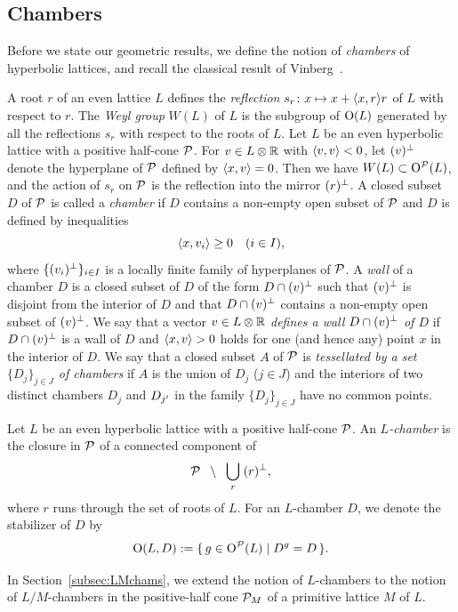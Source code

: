 \documentclass{amsart}
\numberwithin{procedure}{section}
\begin{document}
\subsection{Chambers}\label{subsec:chambers}
%
Before we state our geometric results,
we define the notion of \emph{chambers} of hyperbolic lattices,
and recall the classical result of Vinberg~\cite{Vinberg1973}.
\par
A root $r$ of an even lattice
$L$ defines  the \emph{reflection}  $s_r\colon x\mapsto x+\langle x, r \rangle r$ of $L$
with respect to $r$.
The \emph{Weyl group} $W(L)$ of $L$ is 
the subgroup  of  $\mathord{\mathrm{O}}(L)$
generated by all the reflections $s_r$
with respect to the roots of $L$.
Let $L$ be an even hyperbolic lattice
with a positive half-cone $\mathord{\mathcal P}$.
For $v\in L\otimes\mathord{\mathbb R}$ with $\langle v,v \rangle<0$,
let $(v)\sp{\perp}$ denote the hyperplane of $\mathord{\mathcal P}$ defined by
$\langle x, v \rangle=0$.
Then we have    $W(L)\subset \mathord{\mathrm{O}}^{\mathord{\mathcal P}}(L)$,
and the action of $s_r$ on $\mathord{\mathcal P}$ is the reflection into the mirror $(r)\sp{\perp}$.
A closed subset $D$ of $\mathord{\mathcal P}$ is called a \emph{chamber}
if $D$ contains a non-empty open subset of $\mathord{\mathcal P}$
and $D$ is defined by inequalities
\[
\langle x, v_i \rangle\ge 0\quad(i\in I),
\]
where $\{(v_i)\sp{\perp}\}_{i\in I}$ is a locally finite family of hyperplanes
of $\mathord{\mathcal P}$.
A \emph{wall} of a chamber $D$ is
a closed subset of $D$ of the form $D\cap (v)\sp{\perp}$
such that $(v)\sp{\perp}$ is disjoint from the interior of $D$
and that $D\cap (v)\sp{\perp}$  contains a non-empty open subset of $(v)\sp{\perp}$.
We say that  a vector $v\in L\otimes\mathord{\mathbb R}$ \emph{defines a wall $D\cap (v)\sp{\perp}$ of $D$}
if $D\cap (v)\sp{\perp}$ is a wall of $D$ and $\langle x, v \rangle>0$
holds for one (and hence any) point $x$ in the interior of $D$.
We say that a closed subset $A$ of $\mathord{\mathcal P}$ is
\emph{tessellated by a set $\{D_j\}_{j\in J}$
of chambers} if
$A$ is the union of $D_j$ ($j\in J$)  and
the interiors of two distinct chambers $D_j$ and $D_{j\sp\prime}$ in
the family $\{D_j\}_{j\in J}$ have no common  points.
%
\begin{definition}
Let $L$ be an even hyperbolic lattice
with a positive half-cone $\mathord{\mathcal P}$.
An \emph{$L$-chamber} is 
the closure in $\mathord{\mathcal P}$ of a connected component of
\[
\mathord{\mathcal P}\;\;\setminus\;\; \bigcup_{r}\; (r)\sp{\perp},
\]
where $r$ runs through the set of roots of $L$.
For an $L$-chamber $D$, 
we denote 
the stabilizer of $D$ by
\[
\mathord{\mathrm{O}}(L, D):=\{\,{g\in \mathord{\mathrm{O}}^{\mathord{\mathcal P}}(L)}\mid {D^g=D} \,\}.
\]
\end{definition}
%
\begin{remark}
In Section~\ref{subsec:LMchams}, we extend the notion
of $L$-chambers to the notion of $L/M$-chambers
in the positive-half cone $\mathord{\mathcal P}_M$ of 
a primitive lattice $M$ of $L$. 
\end{remark}
\end{document}
